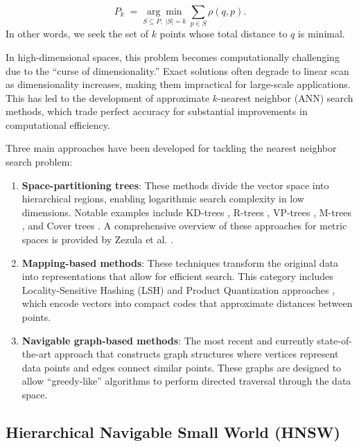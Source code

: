 \documentclass{article}
\begin{document}
\[
P_k 
\;=\;
\underset{S \subseteq P,\;|S|=k}{\arg\min}
\;\sum_{p \in S} \rho(q, p)
.
\]
In other words, we seek the set of $k$ points whose total distance to $q$ is minimal.


In high-dimensional spaces, this problem becomes computationally challenging due to the ``curse of dimensionality.'' Exact solutions often degrade to linear scan as dimensionality increases, making them impractical for large-scale applications. This has led to the development of approximate $k$-nearest neighbor (ANN) search methods, which trade perfect accuracy for substantial improvements in computational efficiency.

Three main approaches have been developed for tackling the nearest neighbor search problem:

\begin{enumerate}
    \item \textbf{Space-partitioning trees}: These methods divide the vector space into hierarchical regions, enabling logarithmic search complexity in low dimensions. Notable examples include KD-trees \cite{Bentley1990k}, R-trees \cite{guttman1984r}, VP-trees \cite{yianilos1993}, M-trees \cite{ciaccia1997m}, and Cover trees \cite{beygelzimer2006cover}. A comprehensive overview of these approaches for metric spaces is provided by Zezula et al. \cite{zezula2006similarity}.

    \item \textbf{Mapping-based methods}: These techniques transform the original data into representations that allow for efficient search. This category includes Locality-Sensitive Hashing (LSH) \cite{Indyk1998,Gionis1999,Datar2004,Andoni2006,Andoni2015} and Product Quantization approaches \cite{Jegou2011,Ge2013,Norouzi2013}, which encode vectors into compact codes that approximate distances between points.

    \item \textbf{Navigable graph-based methods}: The most recent and currently state-of-the-art approach that constructs graph structures where vertices represent data points and edges connect similar points. These graphs are designed to allow ``greedy-like'' algorithms to perform directed traversal through the data space.
\end{enumerate}


\subsection{Hierarchical Navigable Small World (HNSW)}
\end{document}
